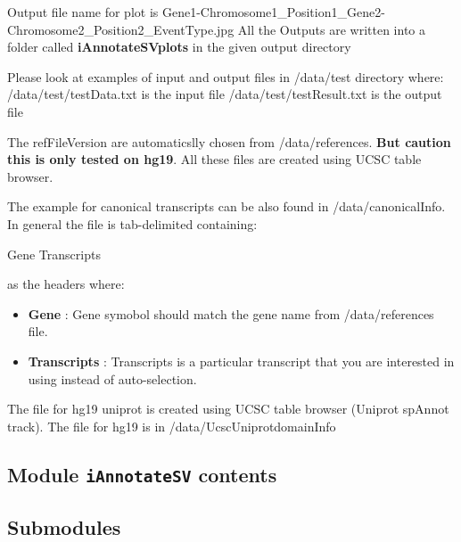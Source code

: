 \documentclass[letterpaper,10pt,english]{sphinxmanual}
\begin{document}
Output file name for plot is Gene1-Chromosome1\_Position1\_Gene2-Chromosome2\_Position2\_EventType.jpg
All the Outputs are written into a folder called \textbf{iAnnotateSVplots} in the given output directory

Please look at examples of input  and output files in /data/test directory where:
/data/test/testData.txt is the input file
/data/test/testResult.txt is the output file

The refFileVersion are automaticslly chosen from /data/references. \textbf{But caution this is only tested on hg19}. All these files are created using UCSC table browser.

The example for canonical transcripts can be also found in /data/canonicalInfo. In general the file is tab-delimited containing:

Gene  Transcripts

as the headers where:
\begin{itemize}
\item {} 
\textbf{Gene} : Gene symobol should match the gene name from  /data/references file.

\item {} 
\textbf{Transcripts} : Transcripts is a particular transcript that you are interested in using instead of auto-selection.

\end{itemize}

The file for hg19 uniprot is created using UCSC table browser (Uniprot spAnnot track). The file for hg19 is in /data/UcscUniprotdomainInfo


\subsection{Module \texttt{iAnnotateSV} contents}
\label{iAnnotateSV:module-iannotatesv-contents}

\subsection{Submodules}
\label{iAnnotateSV:submodules}
\end{document}
